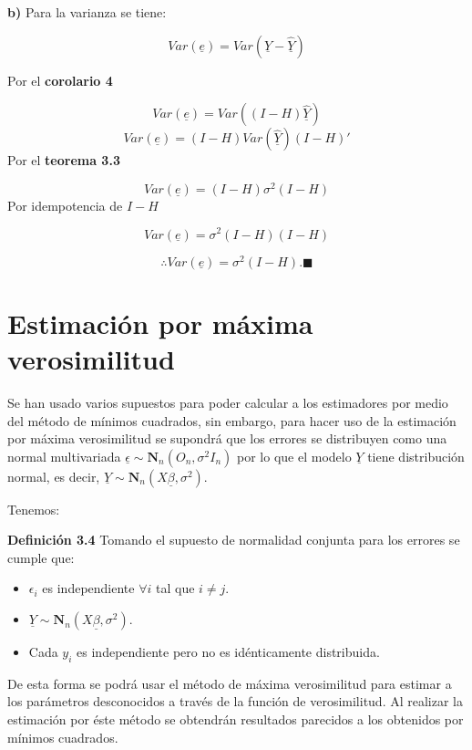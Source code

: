 \documentclass[
  a4paper,
  oneside,
  openany]{book}
\begin{document}
\textbf{b)} Para la varianza se tiene:

\[
Var(\underline{e})=Var\left( \underline{Y}-\underline{\hat{Y}}\right)
\]

Por el \textbf{corolario 4}

\[
Var(\underline{e})=Var\left( (I-H)\underline{\hat{Y}}\right)
\]
\[
Var(\underline{e})=(I-H)Var(\underline{\hat{Y}})(I-H)'
\]
Por el \textbf{teorema 3.3}

\[
Var(\underline{e})=(I-H)\sigma^2(I-H)
\]
Por idempotencia de \(I-H\)

\[
Var(\underline{e})=\sigma^2(I-H)(I-H)
\]

\[
\therefore Var(\underline{e})=\sigma^2(I-H). \blacksquare
\]

\hypertarget{estimaciuxf3n-por-muxe1xima-verosimilitud}{%
\section{Estimación por máxima verosimilitud}\label{estimaciuxf3n-por-muxe1xima-verosimilitud}}

Se han usado varios supuestos para poder calcular a los estimadores por medio del método de mínimos cuadrados, sin embargo, para hacer uso de la estimación por máxima verosimilitud se supondrá que los errores se distribuyen como una normal multivariada \(\underline{\epsilon} \sim \mathbf{N}_{n}(O_{n},\sigma^2 I_{n})\) por lo que el modelo \(\underline{Y}\) tiene distribución normal, es decir, \(\underline{Y} \sim \mathbf{N}_n (X\underline{\beta},\sigma^2).\)

Tenemos:

\textbf{Definición 3.4} Tomando el supuesto de normalidad conjunta para los errores se cumple que:

\begin{itemize}
\item
  \(\epsilon_{i}\) es independiente \(\forall i\) tal que \(i \neq j.\)
\item
  \(\underline{Y}\sim \mathbf{N}_{n}(X\underline{\beta},\sigma^2).\)
\item
  Cada \(y_{i}\) es independiente pero no es idénticamente distribuida.
\end{itemize}

De esta forma se podrá usar el método de máxima verosimilitud para estimar a los parámetros desconocidos a través de la función de verosimilitud. Al realizar la estimación por éste método se obtendrán resultados parecidos a los obtenidos por mínimos cuadrados.
\end{document}
